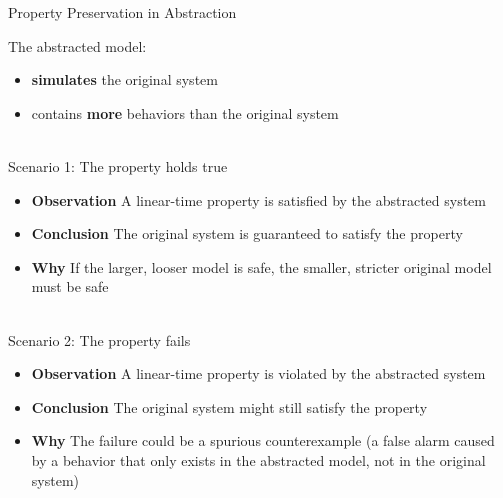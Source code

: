 \documentclass[aspectratio=169]{beamer} %
\begin{document}
	\begin{frame}{Property Preservation in Abstraction}
		
		The abstracted model:
		\begin{itemize}
			\item \textbf{simulates} the original system
			\item contains \textbf{more} behaviors than the original system 
		\end{itemize}
		
		\-\\
		
		Scenario 1: The property holds true
		\begin{itemize}
			\item \textbf{Observation} A linear-time property is satisfied by the abstracted system
			\item \textbf{Conclusion} The original system is guaranteed to satisfy the property
			\item \textbf{Why} If the larger, looser model is safe, the smaller, stricter original model must be safe
		\end{itemize}
		
		\-\\
		
		Scenario 2: The property fails
		\begin{itemize}
			\item \textbf{Observation} A linear-time property is violated by the abstracted system
			\item \textbf{Conclusion} The original system might still satisfy the property
			\item \textbf{Why} The failure could be a spurious counterexample (a false alarm caused by a behavior that only exists in the abstracted model, not in the original system)
		\end{itemize}
		
	\end{frame}
	
\end{document}
